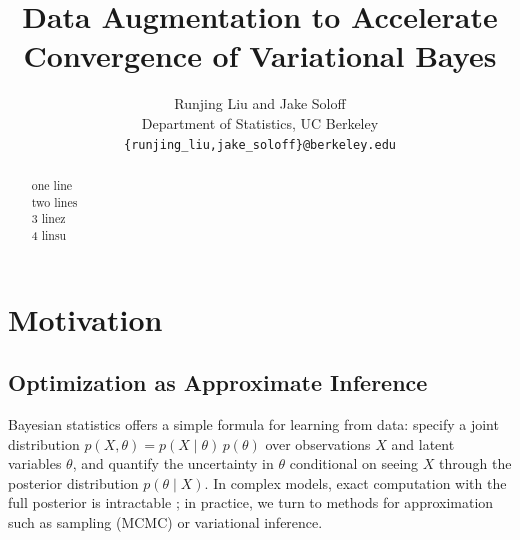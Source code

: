 \documentclass{article}
\title{Data Augmentation to Accelerate Convergence of Variational Bayes}
\author{
  Runjing Liu and Jake Soloff \\
  Department of Statistics, UC Berkeley\\
  \texttt{\{runjing\_liu,jake\_soloff\}@berkeley.edu}
}
\begin{document}

\maketitle

\vspace{-1em}

\begin{abstract}
one line\\two lines\\3 linez\\ 4 linsu
\end{abstract}

\section{Motivation}
\label{motivation}

\subsection{Optimization as Approximate Inference} 

Bayesian statistics offers a simple formula for learning from data: specify a joint distribution $p(X,\theta) = p(X\mid \theta)\,p(\theta)$ over observations $X$ and latent variables $\theta$, and quantify the uncertainty in $\theta$ conditional on seeing $X$ through the posterior distribution $p(\theta\mid X)$. In complex models, exact computation with the full posterior is intractable \cite{Cooper}; in practice, we turn to methods for approximation such as sampling (MCMC) or variational inference.
\end{document}
